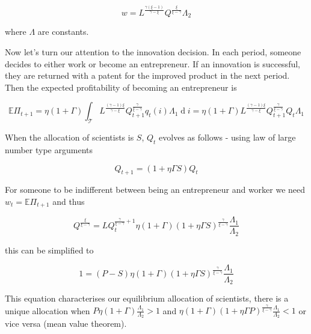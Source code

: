 \documentclass[12pt,english]{article}
\DeclareMathOperator{\di}{d}
\theoremstyle{definition}
\theoremstyle{plain}
\theoremstyle{plain}
\theoremstyle{remark}
\theoremstyle{definition}
\theoremstyle{plain}
\theoremstyle{plain}
\theoremstyle{remark}
\theoremstyle{plain}
\theoremstyle{remark}
\theoremstyle{plain}
\theoremstyle{plain}
\theoremstyle{plain}
\begin{document}
\begin{equation}
w = L^{\frac{\gamma  (\xi -1)}{\gamma -\xi }} Q^{\frac{\xi }{\xi - \gamma }}\Lambda_{2}
\end{equation}


where $\Lambda$ are constants. 

Now let's turn our attention to the innovation decision. In each period, someone decides to either work or become an entrepreneur. If an innovation is successful, they are returned with a patent for the improved product in the next period. Then the expected profitability of becoming an entrepreneur is 

\begin{equation}
\mathbb{E}\Pi_{t+1} =  \eta\left(1+\Gamma\right)\int_{\mathscr{T}}L^{\frac{(\gamma -1) \xi }{\gamma -\xi }} Q_{t+1}^{\frac{\gamma }{\xi -\gamma }}q_{t}\left(i\right) \Lambda_{1}\di i  = \eta\left(1+\Gamma\right)L^{\frac{(\gamma -1) \xi }{\gamma -\xi }} Q_{t+1}^{\frac{\gamma }{\xi -\gamma }}Q_{t} \Lambda_{1}
\end{equation}

When the allocation of scientists is $S$, $Q_{t}$ evolves as follows - using law of large number type arguments 

\begin{equation}
Q_{t+1} = \left(1+\eta\Gamma S\right)Q_{t}
\end{equation}

For someone to be indifferent between being an entrepreneur and worker we need $w_{t} = \mathbb{E}\Pi_{t+1}$ and thus 

\begin{equation}
Q^{\frac{\xi}{\xi-\gamma}} = LQ_{t}^{\frac{\gamma}{\xi-\gamma}+1}\eta\left(1+\Gamma\right)\left(1+\eta\Gamma S\right)^{\frac{\gamma}{\xi-\gamma}}\frac{\Lambda_{1}}{\Lambda_{2}}
\end{equation}

this can be simplified to 

\begin{equation}
1 = \left(P-S\right)\eta\left(1+\Gamma\right)\left(1+\eta\Gamma S\right)^{\frac{\gamma}{\xi-\gamma}}\frac{\Lambda_{1}}{\Lambda_{2}}
\end{equation}

This equation characterises our equilibrium allocation of scientists, there is a unique allocation when $P\eta\left(1+\Gamma\right)\frac{\Lambda_{1}}{\Lambda_{2}}>1$ and $\eta\left(1+\Gamma\right)\left(1+\eta\Gamma P\right)^{\frac{\gamma}{\xi-\gamma}}\frac{\Lambda_{1}}{\Lambda_{2}}<1$ or vice versa (mean value theorem). 
\end{document}
